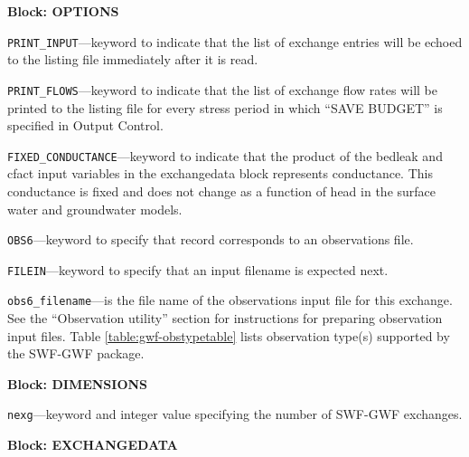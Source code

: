 
\item \textbf{Block: OPTIONS}

\begin{description}
\item \texttt{PRINT\_INPUT}---keyword to indicate that the list of exchange entries will be echoed to the listing file immediately after it is read.

\item \texttt{PRINT\_FLOWS}---keyword to indicate that the list of exchange flow rates will be printed to the listing file for every stress period in which ``SAVE BUDGET'' is specified in Output Control.

\item \texttt{FIXED\_CONDUCTANCE}---keyword to indicate that the product of the bedleak and cfact input variables in the exchangedata block represents conductance.  This conductance is fixed and does not change as a function of head in the surface water and groundwater models.

\item \texttt{OBS6}---keyword to specify that record corresponds to an observations file.

\item \texttt{FILEIN}---keyword to specify that an input filename is expected next.

\item \texttt{obs6\_filename}---is the file name of the observations input file for this exchange. See the ``Observation utility'' section for instructions for preparing observation input files. Table \ref{table:gwf-obstypetable} lists observation type(s) supported by the SWF-GWF package.

\end{description}
\item \textbf{Block: DIMENSIONS}

\begin{description}
\item \texttt{nexg}---keyword and integer value specifying the number of SWF-GWF exchanges.

\end{description}
\item \textbf{Block: EXCHANGEDATA}

